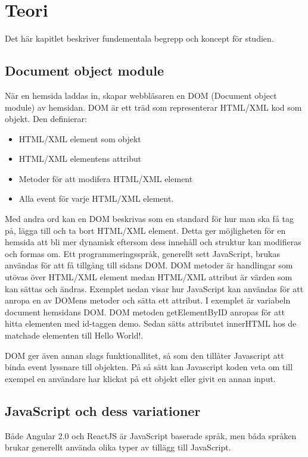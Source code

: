\section{Teori}
\label{sec:axel-theory}
Det här kapitlet beskriver fundementala begrepp och koncept för studien.

\subsection{Document object module}
När en hemsida laddas in, skapar webbläsaren en DOM (Document object module) av hemsidan. DOM är ett träd som representerar HTML/XML kod som objekt. \cite{w3-htmldom} Den definierar:

\begin{itemize}
\item HTML/XML element som objekt
\item HTML/XML elementens attribut
\item Metoder för att modifera HTML/XML element
\item Alla event för varje HTML/XML element.
\end{itemize} 

Med andra ord kan en DOM beskrivas som en standard för hur man ska få tag på, lägga till och ta bort HTML/XML element. Detta ger möjligheten för en hemsida att bli mer dynamisk eftersom dess innehåll och struktur kan modifieras och formas om. Ett programmeringsspråk, generellt sett JavaScript, brukas användas för att få tillgång till sidans DOM. DOM metoder är handlingar som utövas över HTML/XML element medan HTML/XML attribut är värden som kan sättas och ändras. Exemplet nedan visar hur JavaScript kan användas för att anropa en av DOMens metoder och sätta ett attribut. I exemplet är variabeln document hemsidans DOM. DOM metoden getElementByID anropas för att hitta elementen med id-taggen demo. Sedan sätts attributet innerHTML hos de matchade elementen till Hello World!. 

DOM ger även annan slags funktionallitet, så som den tillåter Javascript att binda event lyssnare till objekten. På så sätt kan Javascript koden veta om till exempel en användare har klickat på ett objekt eller givit en annan input.


\subsection{JavaScript och dess variationer}
Både Angular 2.0 och ReactJS är JavaScript baserade språk, men båda språken brukar generellt använda olika typer av tillägg till JavaScript.

